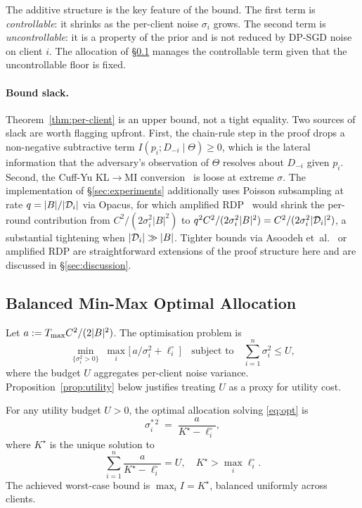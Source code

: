 The additive structure is the key feature of the bound. The first term is
\emph{controllable}: it shrinks as the per-client noise $\sigma_i$
grows. The second term is \emph{uncontrollable}: it is a property of the
prior and is not reduced by DP-SGD noise on client $i$. The allocation
of \S\ref{sec:defense-thm2} manages the controllable term given that
the uncontrollable floor is fixed.

\paragraph{Bound slack.}
Theorem~\ref{thm:per-client} is an upper bound, not a tight equality.
Two sources of slack are worth flagging upfront. First, the chain-rule
step in the proof drops a non-negative subtractive term
$I(p_i; D_{-i} \mid \Theta) \geq 0$, which is the lateral information
that the adversary's observation of $\Theta$ resolves about
$D_{-i}$ given $p_i$. Second, the Cuff-Yu KL$\to$MI
conversion~\cite{cuff2016mi} is loose at extreme $\sigma$. The
implementation of \S\ref{sec:experiments} additionally uses Poisson
subsampling at rate $q = |B|/|\mathcal{D}_i|$ via Opacus, for which
amplified RDP~\cite{wang2019subsampled} would shrink the per-round
contribution from $C^2/(2\sigma_i^2|B|^2)$ to
$q^2 C^2/(2\sigma_i^2|B|^2) = C^2/(2\sigma_i^2|\mathcal{D}_i|^2)$, a
substantial tightening when $|\mathcal{D}_i| \gg |B|$. Tighter bounds via
Asoodeh et~al.~\cite{asoodeh2021variants} or amplified RDP are
straightforward extensions of the proof structure here and are
discussed in \S\ref{sec:discussion}.

\subsection{Balanced Min-Max Optimal Allocation}
\label{sec:defense-thm2}

Let $a := T_{\max} C^2 / (2|B|^2)$. The optimisation problem is
\begin{equation}
\min_{\{\sigma_i^2 > 0\}}\; \max_i \big[\, a / \sigma_i^2 + \ell_i^\circ\, \big]
\quad \text{subject to} \quad
\sum_{i=1}^n \sigma_i^2 \leq U,
\label{eq:opt}
\end{equation}
where the budget $U$ aggregates per-client noise variance.
Proposition~\ref{prop:utility} below justifies treating $U$ as a
proxy for utility cost.

\begin{theorem}
\label{thm:allocation}
For any utility budget $U > 0$, the optimal allocation solving
\eqref{eq:opt} is
\begin{equation}
\sigma_i^{*\,2} \;=\; \frac{a}{K^\star - \ell_i^\circ},
\label{eq:sigma-star}
\end{equation}
where $K^\star$ is the unique solution to
\begin{equation}
\sum_{i=1}^n \frac{a}{K^\star - \ell_i^\circ} = U,
\quad
K^\star > \max_i \ell_i^\circ.
\label{eq:budget-eq}
\end{equation}
The achieved worst-case bound is $\max_i I = K^\star$, balanced uniformly
across clients.
\end{theorem}

